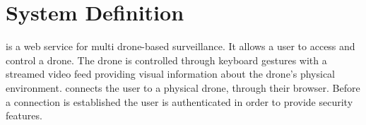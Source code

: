 \section{System Definition}
\projectname{} is a web service for multi drone-based surveillance. It allows a user to access and control a drone. The drone is controlled through keyboard gestures with a streamed video feed providing visual information about the drone’s physical environment. \projectname{} connects the user to a physical drone, through their browser. Before a connection is established the user is authenticated in order to provide security features.